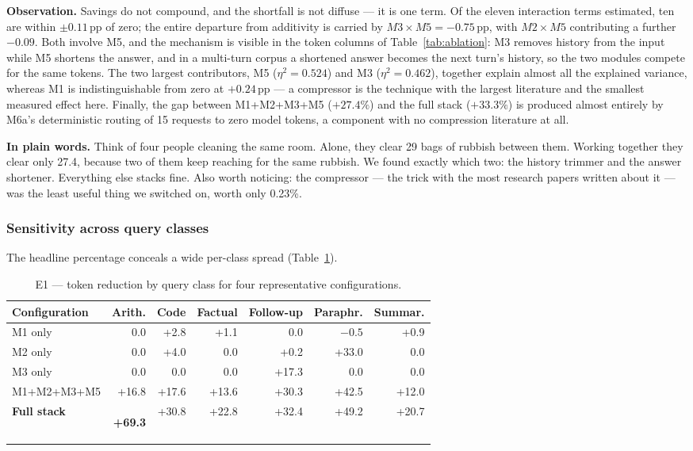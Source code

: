 \documentclass[11pt,a4paper]{article}
\newcommand{\obs}[1]{%
  \par\vspace{2pt}
  \noindent\begin{tcolorbox}[colback=soft,colframe=accent,boxrule=0pt,
    leftrule=2.2pt,arc=0pt,left=7pt,right=5pt,top=4pt,bottom=4pt,breakable]
  \small\textbf{Observation.} #1
  \end{tcolorbox}\par\vspace{2pt}}
\newcommand{\hl}[1]{\colorbox{hlyellow}{\strut #1}}
\newcommand{\plain}[1]{%
  \par\vspace{1pt}
  \noindent\begin{tcolorbox}[colback=plainblue,colframe=plainrule,boxrule=0pt,
    leftrule=2.2pt,arc=0pt,left=7pt,right=5pt,top=4pt,bottom=4pt,breakable]
  \small\textbf{In plain words.} #1
  \end{tcolorbox}\par\vspace{2pt}}
\begin{document}
\obs{Savings do not compound, and the shortfall is not diffuse --- it is one
term. Of the eleven interaction terms estimated, ten are within $\pm0.11$\,pp of
zero; the entire departure from additivity is carried by $M3\times M5 = -0.75$\,pp,
with $M2\times M5$ contributing a further $-0.09$. Both involve M5, and the
mechanism is visible in the token columns of Table~\ref{tab:ablation}: M3 removes
history from the input while M5 shortens the answer, and in a multi-turn corpus a
shortened answer becomes the next turn's history, so the two modules compete for
the same tokens. The two largest contributors, M5 ($\eta^2=0.524$) and M3
($\eta^2=0.462$), together explain almost all the explained variance, whereas M1
is indistinguishable from zero at $+0.24$\,pp --- a compressor is the technique
with the largest literature and the smallest measured effect here. Finally, the
gap between M1+M2+M3+M5 ($+27.4\%$) and the full stack ($+33.3\%$) is produced
almost entirely by M6a's deterministic routing of 15 requests to zero model
tokens, a component with no compression literature at all.}

\plain{Think of four people cleaning the same room. Alone, they clear 29 bags of
rubbish between them. Working together they clear only 27.4, because two of them
keep reaching for the same rubbish. We found exactly which two: the history
trimmer and the answer shortener. Everything else stacks fine. Also worth
noticing: the compressor --- the trick with the most research papers written about
it --- was the least useful thing we switched on, worth only 0.23\%.}

\subsubsection{Sensitivity across query classes}

The headline percentage conceals a wide per-class spread
(Table~\ref{tab:perclass}).

\begin{table}[htbp]
\centering
\caption{E1 --- token reduction by query class for four representative
configurations.}
\label{tab:perclass}
\footnotesize
\begin{tabular}{@{}l rrrrrr@{}}
\toprule
\textbf{Configuration} & \textbf{Arith.} & \textbf{Code} & \textbf{Factual} &
\textbf{Follow-up} & \textbf{Paraphr.} & \textbf{Summar.} \\
\midrule
M1 only        & \phantom{+}0.0 & +2.8  & +1.1  & \phantom{+}0.0 & $-0.5$ & +0.9 \\
M2 only        & \phantom{+}0.0 & +4.0  & \phantom{+}0.0 & +0.2 & +33.0 & \phantom{+}0.0 \\
M3 only        & \phantom{+}0.0 & \phantom{+}0.0 & \phantom{+}0.0 & +17.3 & \phantom{+}0.0 & \phantom{+}0.0 \\
M1+M2+M3+M5    & +16.8 & +17.6 & +13.6 & +30.3 & +42.5 & +12.0 \\
\textbf{Full stack} & \hl{\textbf{+69.3}} & +30.8 & +22.8 & +32.4 & +49.2 & +20.7 \\
\bottomrule
\end{tabular}
\end{table}
\end{document}
